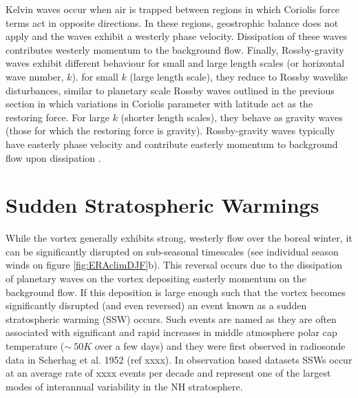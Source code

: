 Kelvin waves occur when air is trapped between regions in which Coriolis force terms act in opposite directions. In these regions, geostrophic balance does not apply and the waves exhibit a westerly phase velocity. Dissipation of these waves contributes westerly momentum to the background flow. Finally, Rossby-gravity waves exhibit different behaviour for small and large length scales (or horizontal wave number, $k$). for small $k$ (large length scale), they reduce to Rossby wavelike disturbances, similar to planetary scale Rossby waves outlined in the previous section in which variations in Coriolis parameter with latitude act as the restoring force. For large $k$ (shorter length scales), they behave as gravity waves (those for which the restoring force is gravity). Rossby-gravity waves typically have easterly phase velocity and contribute easterly momentum to background flow upon dissipation \citep{Andrews1976}.

\section{Sudden Stratospheric Warmings}
While the vortex generally exhibits strong, westerly flow over the boreal winter, it can be significantly disrupted on sub-seasonal timescales
(see individual season winds on figure \ref{fig:ERAclimDJF}b). This reversal occurs due to the dissipation of planetary waves on the vortex depositing easterly momentum on the background flow. If this deposition is large enough such that the vortex becomes significantly disrupted (and even reversed) an event known as a sudden stratospheric warming (SSW) occurs. Such events are named as they are often associated with significant and rapid increases in middle atmosphere polar cap temperature ($\sim~50K$ over a few days) and they were first observed in radiosonde data in Scherhag et al. 1952 (ref xxxx). In observation based datasets SSWs occur at an average rate of xxxx events per decade and represent one of the largest modes of interannual variability in the NH stratosphere.

